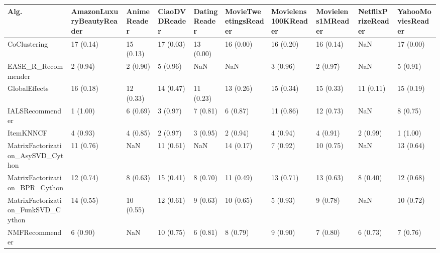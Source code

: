 \begin{tabular}{llllllllll}
\toprule
                               Alg. & AmazonLuxuryBeautyReader & AnimeReader & CiaoDVDReader & DatingReader & MovieTweetingsReader & Movielens100KReader & Movielens1MReader & NetflixPrizeReader & YahooMoviesReader \\
\midrule
                       CoClustering &                17 (0.14) &   15 (0.13) &     17 (0.03) &    13 (0.00) &            16 (0.00) &           16 (0.20) &         16 (0.14) &                NaN &         17 (0.00) \\
                 EASE\_R\_Recommender &                 2 (0.94) &    2 (0.90) &      5 (0.96) &          NaN &                  NaN &            3 (0.96) &          2 (0.97) &                NaN &          5 (0.91) \\
                      GlobalEffects &                16 (0.18) &   12 (0.33) &     14 (0.47) &    11 (0.23) &            13 (0.26) &           15 (0.34) &         15 (0.33) &          11 (0.11) &         15 (0.19) \\
                    IALSRecommender &                 1 (1.00) &    6 (0.69) &      3 (0.97) &     7 (0.81) &             6 (0.87) &           11 (0.86) &         12 (0.73) &                NaN &          8 (0.75) \\
                          ItemKNNCF &                 4 (0.93) &    4 (0.85) &      2 (0.97) &     3 (0.95) &             2 (0.94) &            4 (0.94) &          4 (0.91) &           2 (0.99) &          1 (1.00) \\
  MatrixFactorization\_AsySVD\_Cython &                11 (0.76) &         NaN &     11 (0.61) &          NaN &            14 (0.17) &            7 (0.92) &         10 (0.75) &                NaN &         13 (0.64) \\
     MatrixFactorization\_BPR\_Cython &                12 (0.74) &    8 (0.63) &     15 (0.41) &     8 (0.70) &            11 (0.49) &           13 (0.71) &         13 (0.63) &           8 (0.40) &         12 (0.68) \\
 MatrixFactorization\_FunkSVD\_Cython &                14 (0.55) &   10 (0.55) &     12 (0.61) &     9 (0.63) &            10 (0.65) &            5 (0.93) &          9 (0.78) &                NaN &         10 (0.72) \\
                     NMFRecommender &                 6 (0.90) &         NaN &     10 (0.75) &     6 (0.81) &             8 (0.79) &            9 (0.90) &          7 (0.80) &           6 (0.73) &          7 (0.76) \\

\end{tabular}
